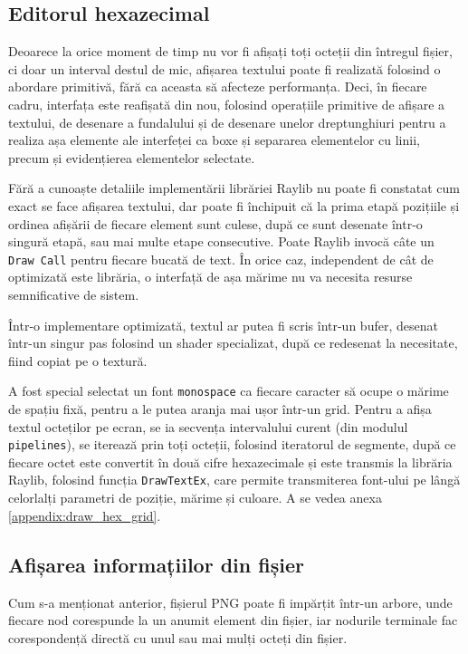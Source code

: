 \documentclass[a4paper,12pt]{report}
\begin{document}
\subsection{Editorul hexazecimal}

Deoarece la orice moment de timp nu vor fi afișați toți octeții din întregul fișier,
ci doar un interval destul de mic, afișarea textului poate fi realizată folosind o abordare primitivă,
fără ca aceasta să afecteze performanța.
Deci, în fiecare cadru, interfața este reafișată din nou, folosind operațiile primitive
de afișare a textului, de desenare a fundalului și de desenare unelor dreptunghiuri
pentru a realiza așa elemente ale interfeței ca boxe și separarea elementelor cu linii,
precum și evidențierea elementelor selectate.

Fără a cunoaște detaliile implementării librăriei Raylib nu poate fi constatat cum exact se face afișarea textului,
dar poate fi închipuit că la prima etapă pozițiile și ordinea afișării de fiecare element sunt culese,
după ce sunt desenate într-o singură etapă, sau mai multe etape consecutive.
Poate Raylib invocă câte un \texttt{Draw Call} pentru fiecare bucată de text.
În orice caz, independent de cât de optimizată este librăria,
o interfață de așa mărime nu va necesita resurse semnificative de sistem.

Într-o implementare optimizată, textul ar putea fi scris într-un bufer,
desenat într-un singur pas folosind un shader specializat,
după ce redesenat la necesitate, fiind copiat pe o textură.

A fost special selectat un font \texttt{monospace} ca fiecare caracter să ocupe o mărime de spațiu fixă,
pentru a le putea aranja mai ușor într-un grid.
Pentru a afișa textul octeților pe ecran, se ia secvența intervalului curent (din modulul \texttt{pipelines}),
se iterează prin toți octeții, folosind iteratorul de segmente,
după ce fiecare octet este convertit în două cifre hexazecimale și este transmis la librăria Raylib,
folosind funcția \texttt{DrawTextEx}, care permite transmiterea font-ului pe lângă
celorlalți parametri de poziție, mărime și culoare.
A se vedea anexa \ref{appendix:draw_hex_grid}.

\subsection{Afișarea informațiilor din fișier}

Cum s-a menționat anterior, fișierul \ac{PNG} poate fi impărțit într-un arbore,
unde fiecare nod corespunde la un anumit element din fișier,
iar nodurile terminale fac corespondență directă cu unul sau mai mulți octeți din fișier.
\end{document}
